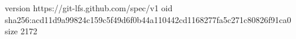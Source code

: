 version https://git-lfs.github.com/spec/v1
oid sha256:acd11d9a99824c159c5f49d6f0b44a110442cd1168277fa5c271c80826f91ca0
size 2172
